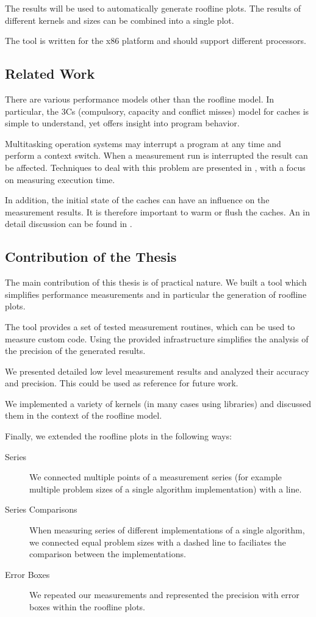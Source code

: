 \documentclass[a4paper,12pt]{article}
\begin{document}
The results will be used to automatically generate roofline plots. The
results of different kernels and sizes can be combined into a single plot.

The tool is written for the x86 platform and should support different
processors. 
 
\subsection{Related Work}
There are various performance models other than the roofline model.
\cite{Asanovic:EECS-2006-183} \cite{Boyd94ahierarchical} In particular, the 3Cs
(compulsory, capacity and conflict misses) model for caches
\cite{Hill:1989:EAC:76602.76603} is simple to understand, yet offers
insight into program behavior.

Multitasking operation systems may interrupt a program at any time and
perform a context switch. When a measurement run is interrupted the result can
be affected. Techniques to deal with this problem are
presented in \cite{ComSysProgPersp}, with a focus on measuring execution time.

In addition, the initial state of the caches can have an influence on the
measurement results. It is therefore important to warm or flush the caches. An
in detail discussion can be found in \cite{Whaley:2008:AAC:1462062.1462065}.

\subsection{Contribution of the Thesis}
The main contribution of this thesis is of practical nature. We built a tool
which simplifies performance measurements and in particular the generation of
roofline plots.

The tool provides a set of tested measurement routines, which can be used
to measure custom code. Using the provided infrastructure simplifies the
analysis of the precision of the generated results.

We presented detailed low level measurement results and analyzed their accuracy
and precision. This could be used as reference for future work.

We implemented a variety of kernels (in many cases using libraries) and
discussed them in the context of the roofline model. 

Finally, we extended the roofline plots in the following ways: 
\begin{description}
\item[Series] We connected multiple points of a measurement series
(for example multiple problem sizes of a single algorithm implementation) with a line.
\item[Series Comparisons] When measuring series of different
implementations of a single algorithm, we connected equal problem sizes with a
dashed line to faciliates the comparison between the implementations.
\item[Error Boxes] We repeated our measurements and represented the precision
with error boxes within the roofline plots.
\end{description}
\end{document}
